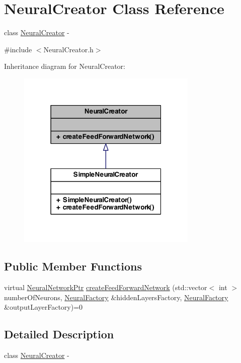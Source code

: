 \hypertarget{class_neural_creator}{
\section{NeuralCreator Class Reference}
\label{class_neural_creator}
}


class \hyperlink{class_neural_creator}{NeuralCreator} -\/  




{\ttfamily \#include $<$NeuralCreator.h$>$}



Inheritance diagram for NeuralCreator:
\nopagebreak
\begin{figure}[H]
\begin{center}
\leavevmode
\includegraphics[width=244pt]{class_neural_creator__inherit__graph}
\end{center}
\end{figure}
\subsection*{Public Member Functions}
\begin{DoxyCompactItemize}
\item 
virtual \hyperlink{_a_m_o_r_e_8h_a7adadf1c313313507b00cd1193db29a1}{NeuralNetworkPtr} \hyperlink{class_neural_creator_a611ada630d83418fbd4ade790a1e655e}{createFeedForwardNetwork} (std::vector$<$ int $>$ numberOfNeurons, \hyperlink{class_neural_factory}{NeuralFactory} \&hiddenLayersFactory, \hyperlink{class_neural_factory}{NeuralFactory} \&outputLayerFactory)=0
\end{DoxyCompactItemize}


\subsection{Detailed Description}
class \hyperlink{class_neural_creator}{NeuralCreator} -\/ 


